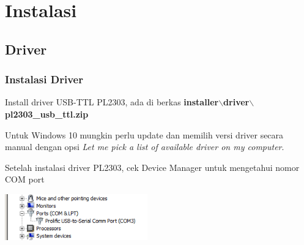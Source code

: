 \documentclass[table,dvipsnames]{beamer}
\begin{document}
	\section{Instalasi}
	\subsection{Driver}
	\begin{frame}
		\frametitle{Instalasi Driver}
		\begin{block}{}
			Install driver USB-TTL PL2303, ada di berkas \textbf{installer$\backslash$driver$\backslash$pl2303\_usb\_ttl.zip}
		\end{block}
	
		\begin{block}{}
			Untuk Windows 10 mungkin perlu update dan memilih versi driver secara manual dengan opsi
			\textit{Let me pick a list of available driver on my computer}.
		\end{block}
	
		\begin{block}{}
			Setelah instalasi driver PL2303, cek Device Manager untuk mengetahui nomor COM port
		\end{block}
	
		\begin{center}
			\includegraphics[width=175pt]{images/comport}
		\end{center}
	\end{frame}
	
\end{document}
